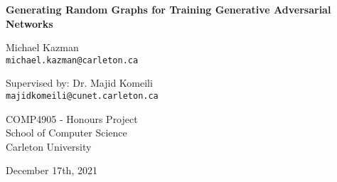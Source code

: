 \begin{titlepage}
        \begin{center}
        \vspace*{1.0cm}

        \Huge
        {\bf Generating Random Graphs for Training Generative Adversarial Networks}

        \vspace*{1.0cm}
        
        \Large
        Michael Kazman \\
        \nolinkurl{michael.kazman@carleton.ca}

        \vspace*{1.0cm}
        
        \Large
        Supervised by: Dr. Majid Komeili \\
        \nolinkurl{majidkomeili@cunet.carleton.ca}

        \vspace*{2.5cm}

        \normalsize
        COMP4905 - Honours Project \\
        School of Computer Science \\
        Carleton University \\

        \vspace*{2.25cm}

        December 17th, 2021 \\
        \end{center}
\end{titlepage}
